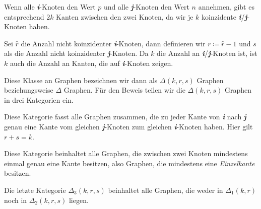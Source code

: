 \documentclass[../Bachelor_LennartKoliwer.tex]{subfiles}
\begin{document}
\begin{example}
    Wenn alle \emph{\textbf{i}}-Knoten den Wert $p$ und alle \emph{\textbf{j}}-Knoten den Wert $n$ annehmen, gibt es entsprechend $2k$ Kanten zwischen den zwei Knoten, da wir je $k$ koinzidente \emph{\textbf{i}}/\emph{\textbf{j}}-Knoten haben.
\end{example}

Sei $\hat{r}$ die Anzahl nicht koinzidenter \emph{\textbf{i}}-Knoten, dann definieren wir $r\coloneqq\hat{r}-1$ und $s$ als die Anzahl nicht koinzidenter \emph{\textbf{j}}-Knoten.
Da $k$ die Anzahl an \emph{\textbf{i}}/\emph{\textbf{j}}-Knoten ist, ist $k$ auch die Anzahl an Kanten, die auf \emph{\textbf{i}}-Knoten zeigen.

Diese Klasse an Graphen bezeichnen wir dann als $\Delta(k,r,s)$ Graphen beziehungsweise $\Delta$ Graphen.
Für den Beweis teilen wir die $\Delta(k,r,s)$ Graphen in drei Kategorien ein.

\begin{description}\label{descr:GraphenKategorien}
    \item[$\Delta_1(k,r,s)$:] Diese Kategorie fasst alle Graphen zusammen, die zu jeder Kante von \emph{\textbf{i}} nach \emph{\textbf{j}} genau eine Kante vom gleichen \emph{\textbf{j}}-Knoten zum gleichen \emph{\textbf{i}}-Knoten haben. Hier gilt $r+s=k$.
    \item[$\Delta_2(k,r,s)$:] Diese Kategorie beinhaltet alle Graphen, die zwischen zwei Knoten mindestens einmal genau eine Kante besitzen, also Graphen, die mindestens eine \emph{Einzelkante} besitzen.
    \item[$\Delta_3(k,r,s)$:] Die letzte Kategorie $\Delta_3(k,r,s)$ beinhaltet alle Graphen, die weder in $\Delta_1(k,r)$ noch in $\Delta_2(k,r,s)$ liegen.
\end{description}
\end{document}
